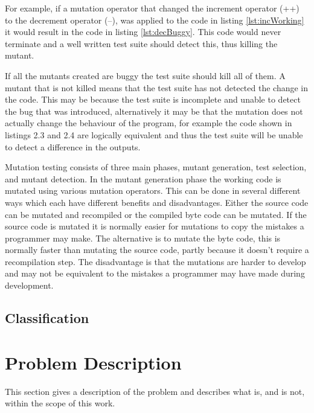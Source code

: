 \documentclass[authoryearcitations]{UoYCSproject}
\begin{document}
For example, if a mutation operator that changed the increment operator (++) to the decrement operator (--), was applied to the code in listing \ref{lst:incWorking} it would result in the code in listing \ref{lst:decBuggy}. This code would never terminate and a well written test suite should detect this, thus killing the mutant.



If all the mutants created are buggy the test suite should kill all of them. A mutant that is not killed means that the test suite has not detected the change in the code. This may be because the test suite is incomplete and unable to detect the bug that was introduced, alternatively it may be that the mutation does not actually change the behaviour of the program, for example the code shown in listings 2.3 and 2.4 are logically equivalent and thus the test suite will be unable to detect a difference in the outputs.




Mutation testing consists of three main phases, mutant generation, test selection, and mutant detection. In the mutant generation phase the working code is mutated using various mutation operators. This can be done in several different ways which each have different benefits and disadvantages. Either the source code can be mutated and recompiled or the compiled byte code can be mutated. If the source code is mutated it is normally easier for mutations to copy the mistakes a programmer may make. The alternative is to mutate the byte code, this is normally faster than mutating the source code, partly because it doesn't require a recompilation step. The disadvantage is that the mutations are harder to develop and may not be equivalent to the mistakes a programmer may have made during development.

\section{Classification}


\chapter{Problem Description}
\label{cha:ProbDesc}
This section gives a description of the problem and describes what is, and is not, within the scope of this work.
\end{document}
